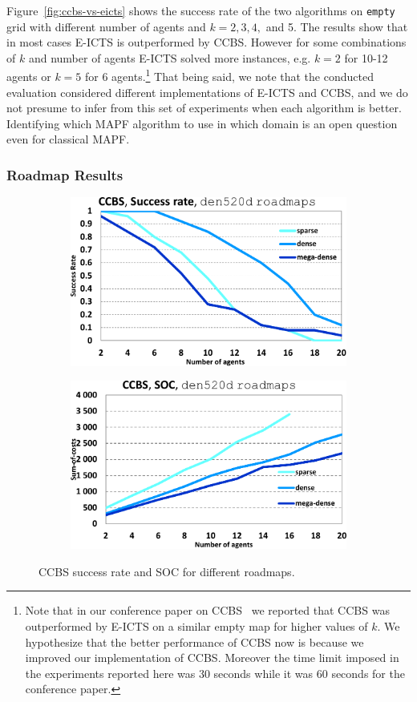 \documentclass[review]{elsarticle}
\newcommand{\ccbs}{\ac{CCBS}\xspace}
\newcommand{\mapf}{\ac{MAPF}\xspace}
\begin{document}
Figure~\ref{fig:ccbs-vs-eicts} shows the success rate of the two algorithms on \texttt{empty} grid with different number of agents and $k=2, 3, 4,$ and 5. The results show that in most cases E-ICTS is outperformed by \ccbs. However for some combinations of $k$ and number of agents E-ICTS solved more instances, e.g. $k=2$ for 10-12 agents or $k=5$ for 6 agents.\footnote{Note that in our conference paper on \ccbs~\cite{andreychuk2019multi} we reported that \ccbs was outperformed by E-ICTS on a similar empty map for higher values of $k$. We hypothesize that the better performance of \ccbs now is because we improved our implementation of \ccbs. 
Moreover the time limit imposed in the experiments reported here was 30 seconds while it was 60 seconds for the conference paper.}
That being said, we note that the conducted evaluation considered different implementations of E-ICTS and \ccbs, and we do not presume to infer from this set of experiments when each algorithm is better. Identifying which \mapf algorithm to use in which domain is an open question even for classical \mapf.


\subsubsection{Roadmap Results}


\begin{figure}
\centering
    \centering
    
    \begin{subfigure}
        \centering
        \includegraphics[width=0.45\linewidth]{mapfr-sr-plot-ccbs-den520d_roadmaps.pdf}
    \end{subfigure}\hspace{0.025\linewidth}
    \begin{subfigure}
        \centering
        \includegraphics[width=0.45\linewidth]{mapfr-SOC-plot-ccbs-den520d_roadmaps.pdf}
    \end{subfigure}%
    
    \caption{\ccbs success rate and SOC for different roadmaps.}
    \label{fig:results-ccbs-SR-SOC-roadmaps}
\end{figure}
\end{document}
